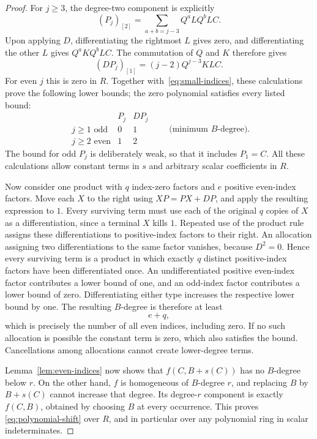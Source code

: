 \documentclass[11pt]{article}
\theoremstyle{definition}
\theoremstyle{remark}
\numberwithin{equation}{section}
\begin{document}
\begin{proof}
For $j\geq3$, the degree-two component is explicitly
\[
 (P_j)_{[2]}=
 \sum_{a+b=j-3}Q^aLQ^bLC.
\]
Upon applying $D$, differentiating the rightmost $L$ gives zero,
and differentiating the other $L$ gives $Q^aKQ^bLC$.
The commutation of $Q$ and $K$ therefore gives
\begin{equation}
 \label{eq:differentiated-linear-part}
 (DP_j)_{[1]}=(j-2)Q^{j-3}KLC.
\end{equation}
For even $j$ this is zero in $R$.
Together with~\eqref{eq:small-indices}, these calculations prove
the following lower bounds; the zero polynomial satisfies every
listed bound:
\[
\begin{array}{c|cc}
 & P_j & DP_j\\ \hline
 j\geq1\text{ odd} & 0 & 1\\
 j\geq2\text{ even} & 1 & 2
\end{array}
\qquad\text{(minimum $B$-degree).}
\]
The bound for odd $P_j$ is deliberately weak, so that it includes
$P_1=C$.
All these calculations allow constant terms in $s$ and arbitrary
scalar coefficients in $R$.

Now consider one product with $q$ index-zero factors and $e$ positive
even-index factors.  Move each $X$ to the right using
$XP=PX+DP$, and apply the resulting expression to $1$.
Every surviving term must use each of the original $q$ copies of
$X$ as a differentiation, since a terminal $X$ kills $1$.
Repeated use of the product rule assigns these differentiations
to positive-index factors to their right.  An allocation assigning
two differentiations to the same factor vanishes, because $D^2=0$.
Hence every surviving term is a product in which exactly $q$
distinct positive-index factors have been differentiated once.
An undifferentiated positive even-index factor contributes a lower
bound of one, and an odd-index factor contributes a lower bound
of zero.  Differentiating either type increases the respective
lower bound by one.  The resulting $B$-degree is therefore at least
\[
 e+q,
\]
which is precisely the number of all even indices, including zero.
If no such allocation is possible the constant term is zero, which
also satisfies the bound.  Cancellations among allocations cannot
create lower-degree terms.

Lemma~\ref{lem:even-indices} now shows that $f(C,B+s(C))$ has no
$B$-degree below $r$.  On the other hand, $f$ is homogeneous of
$B$-degree $r$, and replacing $B$ by $B+s(C)$ cannot increase that
degree.  Its degree-$r$ component is exactly $f(C,B)$, obtained by
choosing $B$ at every occurrence.  This proves
\eqref{eq:polynomial-shift} over $R$, and in particular over any
polynomial ring in scalar indeterminates.
\end{proof}
\end{document}
